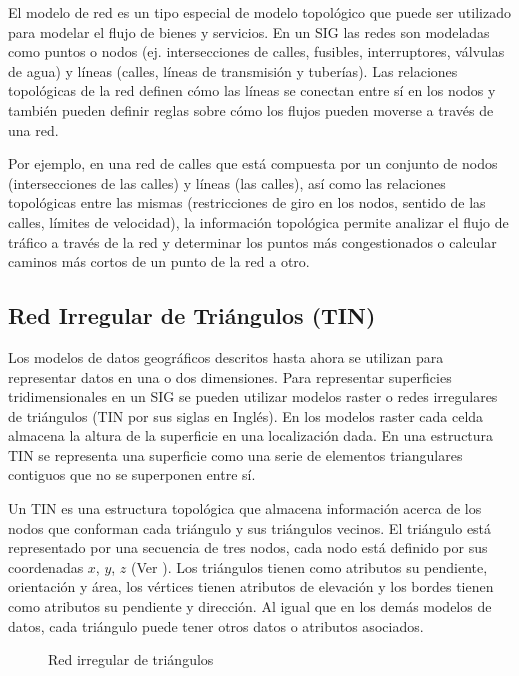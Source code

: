 El modelo de red es un tipo especial de modelo topológico que puede ser utilizado para modelar el flujo de bienes y servicios. En un SIG las redes son modeladas como puntos o nodos (ej. intersecciones de calles, fusibles, interruptores, válvulas de agua) y líneas  (calles, líneas de transmisión y tuberías).  Las relaciones topológicas de la red definen  cómo las líneas se conectan entre sí en los nodos y también pueden definir reglas sobre cómo los flujos pueden moverse a través de una red.

Por ejemplo, en una red de calles que está compuesta por un conjunto de nodos (intersecciones de las calles) y líneas (las calles), así como las relaciones topológicas entre las mismas (restricciones de giro en los nodos, sentido de las calles, límites de velocidad), la información topológica permite analizar el flujo de tráfico a través de la red y determinar los puntos más congestionados o calcular caminos más cortos de un punto de la red a otro.

\subsection{Red Irregular de Triángulos (TIN)}

Los modelos de datos geográficos descritos hasta ahora se utilizan para representar datos en una o dos dimensiones. Para representar superficies tridimensionales en un SIG se pueden utilizar modelos raster o redes irregulares de triángulos (TIN por sus siglas en Inglés). En los modelos raster cada celda almacena la altura de la superficie en una localización dada. En una estructura TIN se representa una superficie como una serie de elementos triangulares contiguos que no se superponen entre sí.

Un TIN es una estructura topológica que almacena información acerca de los nodos que conforman cada triángulo y sus triángulos vecinos. El triángulo está representado por una secuencia de tres nodos, cada nodo está definido por sus coordenadas $x$, $y$, $z$ (Ver ). Los triángulos tienen como atributos su pendiente, orientación y área, los vértices tienen atributos de elevación y los bordes tienen como atributos su pendiente y dirección. Al igual que en los demás modelos de datos, cada triángulo puede tener otros datos o atributos asociados.

\begin{figure}[h]
	\centering
	
	\caption{Red irregular de triángulos}
	\label{fig:modelo-tin} 
\end{figure}

